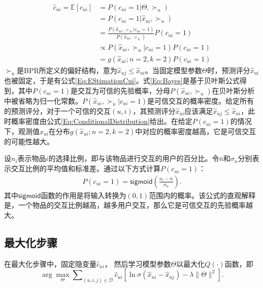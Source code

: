 \begin{align}
 \hat{c}_{ui}=	\mathbb{E}[c_{ui}] &= P({c_{ui}} = 1|\Theta,{ \succ _u}) \nonumber \\
	&= P({c_{ui}} = 1|{\hat{x}_{ui}} ,\succ_u)  \label{Eq:EStimationCui} \\
	&= \frac{ P( {\hat{x}_{ui}},{ \succ_u}|{c_{ui}} = 1)}{ P({\hat{x}_{ui}} ,\succ_u)}{P({c_{ui}} = 1)} \label{Eq:Bayes}\\
	&\propto P( {\hat{x}_{ui}},{ \succ_u}|{c_{ui}} = 1)P({c_{ui}} = 1) \label{Eq:Bayesian} \\
	&= g({{\hat x}_{ui};n=2,k=2})P({c_{ui}} = 1) \label{Eq:ClassDensity}
\end{align}
$\succ_u$是BPR\cite{Steffen:2009:UAI}所定义的偏好结构，意为$\hat{x}_{uj}\leq \hat{x}_{ui}$。当固定模型参数$\Theta$时，预测评分$\hat{x}_{ui}$也被固定，于是有公式\eqref{Eq:EStimationCui}。式\eqref{Eq:Bayes}是基于贝叶斯公式得到，其中$P(c_{ui}=1)$是交互为可信的先验概率，分母$P(\hat{x}_{ui},\succ_u)$在贝叶斯分析中被省略为归一化常数。$P(\hat{x}_{ui},\succ_u|c_{ui}=1)$是可信交互的概率密度。给定所有的预测评分，对于一个可信的交互$(u,i)$，其预测评分$\hat{x}_{ui}$应该满足$\hat{x}_{uj} \leq \hat{x}_{ui}$，此时概率密度由公式\eqref{Eq:ConditionalDistribution}给出。在给定$P(c_{ui}=1)$的情况下，观测值$\hat{x}_{ui}$在分布$g({{\hat x}_{ui};n=2,k=2})$中对应的概率密度越高，它是可信交互的可能性越大。

设$n_i$表示物品$i$的选择比例，即与该物品进行交互的用户的百分比。令$\bar{n}$和$\sigma_n$分别表示交互比例的平均值和标准差。通过以下方式计算$P(c_{ui} =1)$：
\begin{eqnarray}
	P(c_{ui} =1) = \mathsf{sigmoid}(\frac{n_i - \bar{n} }{\sigma_n}).
\end{eqnarray}
其中$\mathsf{sigmoid}$函数的作用是将输入转换为$(0,1)$范围内的概率。该公式的直观解释是，一个物品的交互比例越高，越多用户交互，那么它是可信交互的先验概率越大。

\subsection{最大化步骤}
在最大化步骤中，固定隐变量$\hat{c}_{ui}$， 然后学习模型参数$\Theta$以最大化$Q(\cdot)$函数，即
\begin{equation}\label{Eq:MaxQFunction}
	\arg \mathop {\max }\limits_\Theta  \sum\nolimits_{(u,i,j) \in \mathcal{D}} {{{\hat c}_{ui}}[\ln \sigma ({{\hat x}_{ui}} - {{\hat x}_{uj}}) - {\lambda  }\|\Theta\|^2]}.
\end{equation}

